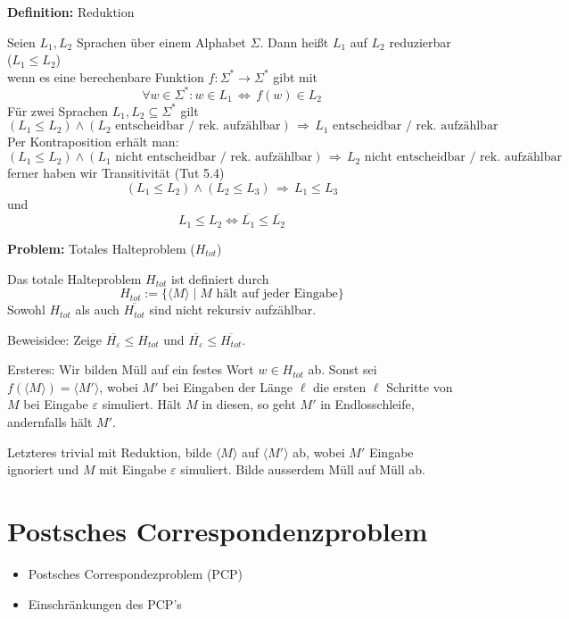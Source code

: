 \documentclass[a4paper,graphics,11pt]{article}
\newcommand{\eps}[0]{\varepsilon}
\newcommand{\godel}[1]{\langle #1 \rangle}
\newcommand{\Iff}[0]{\,\Longleftrightarrow\,}
\begin{document}
\strut

\textbf{Definition:} Reduktion

Seien $L_1,L_2$ Sprachen über einem Alphabet $\Sigma$. Dann heißt $L_1$ auf $L_2$ reduzierbar ($L_1 \leq L_2$)\\
wenn es eine berechenbare Funktion $f : \Sigma^* \to \Sigma^*$ gibt mit
$$
    \forall w \in \Sigma^* : w \in L_1 \Iff f(w) \in L_2
$$
Für zwei Sprachen $L_1,L_2 \subseteq \Sigma^*$ gilt
$$
    (L_1 \leq L_2) \land (L_2 \text{ entscheidbar / rek. aufzählbar})
    \,\Longrightarrow\, L_1 \text{ entscheidbar / rek. aufzählbar}
$$
Per Kontraposition erhält man:
$$
    (L_1 \leq L_2) \land (L_1 \text{ nicht entscheidbar / rek. aufzählbar})
    \,\Longrightarrow\, L_2 \text{ nicht entscheidbar / rek. aufzählbar}
$$
ferner haben wir Transitivität (Tut 5.4)
$$
    (L_1 \leq L_2) \land (L_2 \leq L_3) \,\Longrightarrow\, L_1 \leq L_3
$$
und
$$
    L_1 \leq L_2 \iff \overline{L_1} \leq \overline{L_2}
$$

\strut

\textbf{Problem:} Totales Halteproblem ($H_{tot}$)

Das totale Halteproblem $H_{tot}$ ist definiert durch
$$
    H_{tot} := \{\godel{M} \mid M \text{ hält auf jeder Eingabe} \}
$$
Sowohl $H_{tot}$ als auch $\overline{H_{tot}}$ sind nicht rekursiv aufzählbar.

Beweisidee: Zeige $\overline{H_\eps} \leq H_{tot}$ und $\overline{H_\eps} \leq \overline{H_{tot}}$.

Ersteres:
Wir bilden Müll auf ein festes Wort $w \in H_{tot}$ ab. Sonst sei $f(\godel{M}) = \godel{M'}$,
wobei $M'$ bei Eingaben der Länge $\ell$ die ersten $\ell$ Schritte von $M$ bei Eingabe $\eps$ simuliert.
Hält $M$ in diesen, so geht $M'$ in Endlosschleife, andernfalls hält $M'$.

Letzteres trivial mit Reduktion, bilde $\godel{M}$ auf $\godel{M'}$ ab, wobei $M'$ Eingabe ignoriert
und $M$ mit Eingabe $\eps$ simuliert. Bilde ausserdem Müll auf Müll ab.



\newpage



\section{Postsches Correspondenzproblem}


\begin{itemize}
    \item Postsches Correspondezproblem (PCP)
    \item Einschränkungen des PCP's
\end{itemize}
\end{document}
